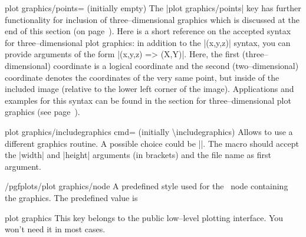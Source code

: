 {{\begin{pgfplotskey}{plot graphics/points= (initially empty)}
	The |plot graphics/points| key has further functionality for inclusion of three--dimensional graphics which is discussed at the end of this section (on page~\pageref{sec:plotgraphics3d}). Here is a short reference on the accepted syntax for three--dimensional plot graphics: in addition to the |(x,y,z)| syntax, you can provide arguments of the form |(x,y,z) => (X,Y)|. Here, the first (three--dimensional) coordinate is a logical coordinate and the second (two--dimensional) coordinate denotes the coordinates of the very same point, but inside of the included image (relative to the lower left corner of the image). Applications and examples for this syntax can be found in the section for three--dimensional plot graphics (see page~\pageref{sec:plotgraphics3d}).
\end{pgfplotskey}

\begin{pgfplotskey}{plot graphics/includegraphics cmd= (initially \textbackslash includegraphics)}
	Allows to use a different graphics routine. A possible choice could be |\pgfimage|. The macro should accept the |width| and |height| arguments (in brackets) and the file name as first argument.
\end{pgfplotskey}
\begin{stylekey}{/pgfplots/plot graphics/node}
	A predefined style used for the \Tikz\ node containing the graphics. The predefined value is
\begin{codeexample}
\end{codeexample}
\end{stylekey}

\begin{pgfplotskey}{plot graphics}
	This key belongs to the public low--level plotting interface. You won't need it in most cases.


\end{pgfplotskey}}}
